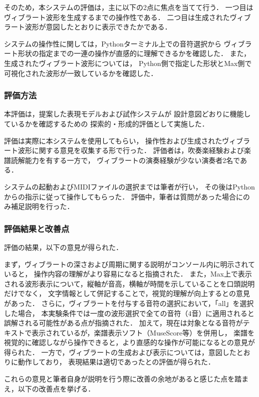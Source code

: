 そのため，本システムの評価は，主に以下の2点に焦点を当てて行う．
一つ目はヴィブラート波形を生成するまでの操作性である．
二つ目は生成されたヴィブラート波形が意図したとおりに表示できたかである．

システムの操作性に関しては，Pythonターミナル上での音符選択から
ヴィブラート形状の指定までの一連の操作が直感的に理解できるかを確認した．
また，生成されたヴィブラート波形については，
Python側で指定した形状とMax側で可視化された波形が一致しているかを確認した．


\subsubsection{評価方法}
本評価は，提案した表現モデルおよび試作システムが
設計意図どおりに機能しているかを確認するための
探索的・形成的評価として実施した．

評価は実際に本システムを使用してもらい，
操作性および生成されたヴィブラート波形に関する意見を収集する形で行った．
評価者は，吹奏楽経験および楽譜読解能力を有する一方で，
ヴィブラートの演奏経験が少ない演奏者2名である．

システムの起動およびMIDIファイルの選択までは筆者が行い，
その後はPythonからの指示に従って操作してもらった．
評価中，筆者は質問があった場合にのみ補足説明を行った．


\subsubsection{評価結果と改善点}
評価の結果，以下の意見が得られた．

まず，ヴィブラートの深さおよび周期に関する説明がコンソール内に明示されていると，
操作内容の理解がより容易になると指摘された．
また，Max上で表示される波形表示について，縦軸が音高，横軸が時間を示していることを口頭説明だけでなく，
文字情報として併記することで，視覚的理解が向上するとの意見があった．
さらに，ヴィブラートを付与する音符の選択において，「all」を選択した場合，
本実験条件では一度の波形選択で全ての音符（4音）に適用されると誤解される可能性がある点が指摘された．
加えて，現在は対象となる音符がテキストで表示されているが，楽譜表示ソフト（MuseScore等）を併用し，
楽譜を視覚的に確認しながら操作できると，より直感的な操作が可能になるとの意見が得られた．
一方で，ヴィブラートの生成および表示については，意図したとおりに動作しており，
表現結果は適切であったとの評価が得られた．

これらの意見と筆者自身が説明を行う際に改善の余地があると感じた点を踏まえ，以下の改善点を挙げる．

